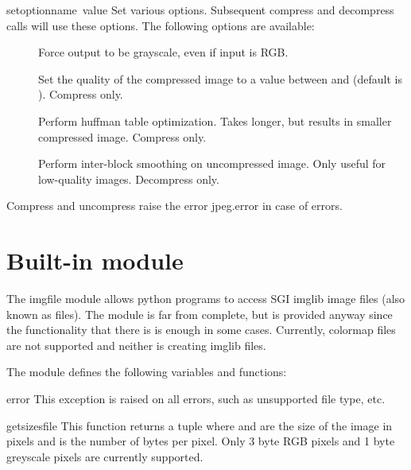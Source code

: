\begin{funcdesc}{setoption}{name\, value}
Set various options.  Subsequent compress and decompress calls
will use these options.  The following options are available:
\begin{description}
\item[]
Force output to be grayscale, even if input is RGB.

\item[]
Set the quality of the compressed image to a
value between  and  (default is ).  Compress only.

\item[]
Perform huffman table optimization.  Takes longer, but results in
smaller compressed image.  Compress only.

\item[]
Perform inter-block smoothing on uncompressed image.  Only useful for
low-quality images.  Decompress only.
\end{description}
\end{funcdesc}

Compress and uncompress raise the error jpeg.error in case of errors.

\section{Built-in module }

The imgfile module allows python programs to access SGI imglib image
files (also known as  files).  The module is far from
complete, but is provided anyway since the functionality that there is
is enough in some cases.  Currently, colormap files are not supported
and neither is creating imglib files.

The module defines the following variables and functions:

\renewcommand{\indexsubitem}{(in module imgfile)}
\begin{excdesc}{error}
This exception is raised on all errors, such as unsupported file type, etc.
\end{excdesc}

\begin{funcdesc}{getsizes}{file}
This function returns a tuple  where
 and  are the size of the image in pixels and
 is the number of
bytes per pixel. Only 3 byte RGB pixels and 1 byte greyscale pixels
are currently supported.
\end{funcdesc}

